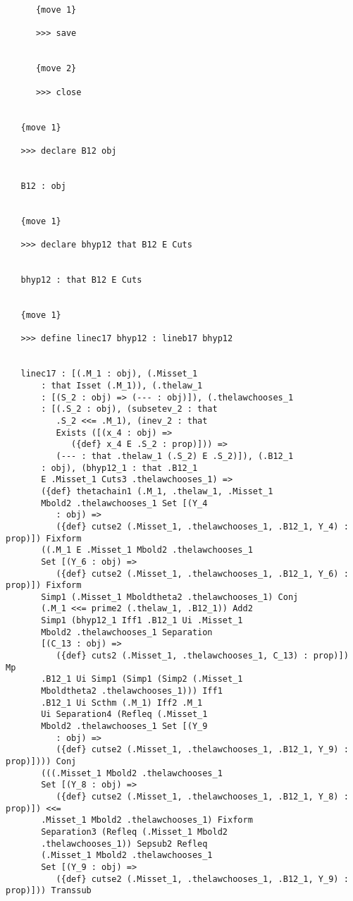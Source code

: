 \documentclass[12pt]{article}
\begin{document}
\begin{verbatim}
      {move 1}

      >>> save


      {move 2}

      >>> close


   {move 1}

   >>> declare B12 obj


   B12 : obj


   {move 1}

   >>> declare bhyp12 that B12 E Cuts


   bhyp12 : that B12 E Cuts


   {move 1}

   >>> define linec17 bhyp12 : lineb17 bhyp12


   linec17 : [(.M_1 : obj), (.Misset_1 
       : that Isset (.M_1)), (.thelaw_1 
       : [(S_2 : obj) => (--- : obj)]), (.thelawchooses_1 
       : [(.S_2 : obj), (subsetev_2 : that 
          .S_2 <<= .M_1), (inev_2 : that 
          Exists ([(x_4 : obj) => 
             ({def} x_4 E .S_2 : prop)])) => 
          (--- : that .thelaw_1 (.S_2) E .S_2)]), (.B12_1 
       : obj), (bhyp12_1 : that .B12_1 
       E .Misset_1 Cuts3 .thelawchooses_1) => 
       ({def} thetachain1 (.M_1, .thelaw_1, .Misset_1 
       Mbold2 .thelawchooses_1 Set [(Y_4 
          : obj) => 
          ({def} cutse2 (.Misset_1, .thelawchooses_1, .B12_1, Y_4) : prop)]) Fixform 
       ((.M_1 E .Misset_1 Mbold2 .thelawchooses_1 
       Set [(Y_6 : obj) => 
          ({def} cutse2 (.Misset_1, .thelawchooses_1, .B12_1, Y_6) : prop)]) Fixform 
       Simp1 (.Misset_1 Mboldtheta2 .thelawchooses_1) Conj 
       (.M_1 <<= prime2 (.thelaw_1, .B12_1)) Add2 
       Simp1 (bhyp12_1 Iff1 .B12_1 Ui .Misset_1 
       Mbold2 .thelawchooses_1 Separation 
       [(C_13 : obj) => 
          ({def} cuts2 (.Misset_1, .thelawchooses_1, C_13) : prop)]) Mp 
       .B12_1 Ui Simp1 (Simp1 (Simp2 (.Misset_1 
       Mboldtheta2 .thelawchooses_1))) Iff1 
       .B12_1 Ui Scthm (.M_1) Iff2 .M_1 
       Ui Separation4 (Refleq (.Misset_1 
       Mbold2 .thelawchooses_1 Set [(Y_9 
          : obj) => 
          ({def} cutse2 (.Misset_1, .thelawchooses_1, .B12_1, Y_9) : prop)]))) Conj 
       (((.Misset_1 Mbold2 .thelawchooses_1 
       Set [(Y_8 : obj) => 
          ({def} cutse2 (.Misset_1, .thelawchooses_1, .B12_1, Y_8) : prop)]) <<= 
       .Misset_1 Mbold2 .thelawchooses_1) Fixform 
       Separation3 (Refleq (.Misset_1 Mbold2 
       .thelawchooses_1)) Sepsub2 Refleq 
       (.Misset_1 Mbold2 .thelawchooses_1 
       Set [(Y_9 : obj) => 
          ({def} cutse2 (.Misset_1, .thelawchooses_1, .B12_1, Y_9) : prop)])) Transsub 

\end{verbatim}
\end{document}

